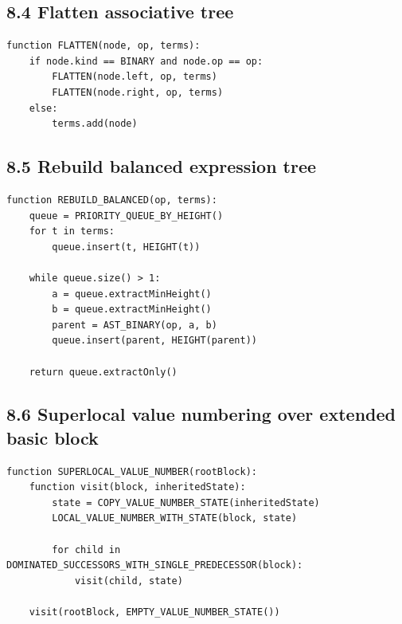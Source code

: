 \documentclass[10pt,letterpaper]{article}
\begin{document}
\subsection*{8.4 Flatten associative tree}

\begin{verbatim}
function FLATTEN(node, op, terms):
    if node.kind == BINARY and node.op == op:
        FLATTEN(node.left, op, terms)
        FLATTEN(node.right, op, terms)
    else:
        terms.add(node)
\end{verbatim}

\subsection*{8.5 Rebuild balanced expression tree}

\begin{verbatim}
function REBUILD_BALANCED(op, terms):
    queue = PRIORITY_QUEUE_BY_HEIGHT()
    for t in terms:
        queue.insert(t, HEIGHT(t))

    while queue.size() > 1:
        a = queue.extractMinHeight()
        b = queue.extractMinHeight()
        parent = AST_BINARY(op, a, b)
        queue.insert(parent, HEIGHT(parent))

    return queue.extractOnly()
\end{verbatim}

\subsection*{8.6 Superlocal value numbering over extended basic block}

\begin{verbatim}
function SUPERLOCAL_VALUE_NUMBER(rootBlock):
    function visit(block, inheritedState):
        state = COPY_VALUE_NUMBER_STATE(inheritedState)
        LOCAL_VALUE_NUMBER_WITH_STATE(block, state)

        for child in DOMINATED_SUCCESSORS_WITH_SINGLE_PREDECESSOR(block):
            visit(child, state)

    visit(rootBlock, EMPTY_VALUE_NUMBER_STATE())
\end{verbatim}

\end{document}
